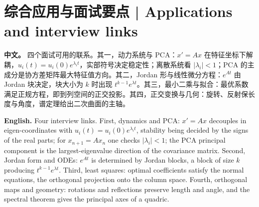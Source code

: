 \documentclass[UTF8,11pt,a4paper]{ctexart}
\newcommand{\APS}[2]{\par\noindent\textbf{中文。} #1\par\noindent\textbf{English.} #2\par\smallskip}
\begin{document}
\section*{综合应用与面试要点 | Applications and interview links}
\APS{四个面试可用的联系。其一，动力系统与 PCA：$x'=Ax$ 在特征坐标下解耦，$u_i(t)=u_i(0)e^{\lambda_it}$，实部符号决定稳定性；离散系统看 $|\lambda_i|<1$；PCA 的主成分是协方差矩阵最大特征值方向。其二，Jordan 形与线性微分方程：$e^{At}$ 由 Jordan 块决定，块大小为 $k$ 时出现 $t^{k-1}e^{\lambda t}$。其三，最小二乘与拟合：最优系数满足正规方程，即到列空间的正交投影。其四，正交变换与几何：旋转、反射保长度与角度，谱定理给出二次曲面的主轴。}{Four interview links. First, dynamics and PCA: $x'=Ax$ decouples in eigen-coordinates with $u_i(t)=u_i(0)e^{\lambda_it}$, stability being decided by the signs of the real parts; for $x_{n+1}=Ax_n$ one checks $|\lambda_i|<1$; the PCA principal component is the largest-eigenvalue direction of the covariance matrix. Second, Jordan form and ODEs: $e^{At}$ is determined by Jordan blocks, a block of size $k$ producing $t^{k-1}e^{\lambda t}$. Third, least squares: optimal coefficients satisfy the normal equations, the orthogonal projection onto the column space. Fourth, orthogonal maps and geometry: rotations and reflections preserve length and angle, and the spectral theorem gives the principal axes of a quadric.}
\end{document}
